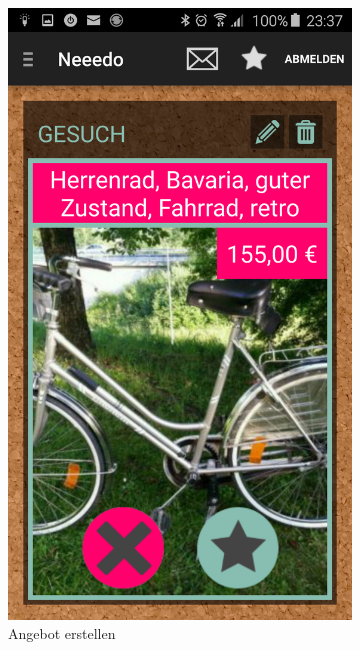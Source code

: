 \begin{figure}[H]
\begin{subfigure}{0.5\textwidth}
\includegraphics[width=0.9\linewidth]{./Bilder/matching1.png} 
\caption{Angebot erstellen}
\label{fig:match1}
\end{subfigure}
\begin{subfigure}{0.5\textwidth}

\end{subfigure}
\end{figure}
